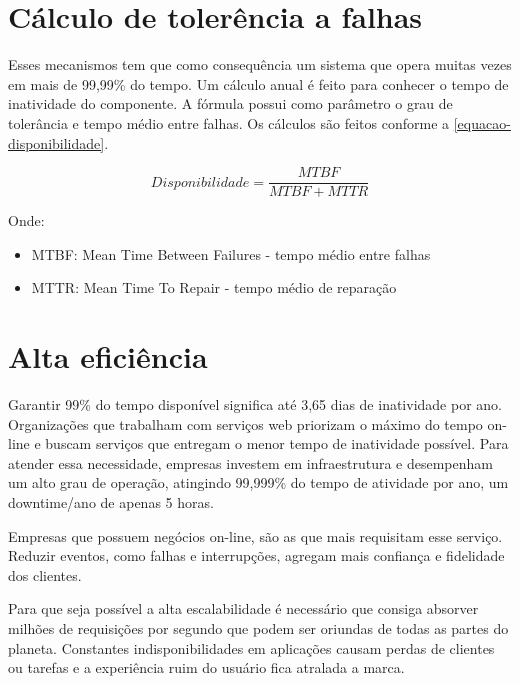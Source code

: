 \section{Cálculo de tolerência a falhas}

Esses mecanismos tem que como consequência um sistema que opera
muitas vezes em mais de 99,99\% do tempo.
Um cálculo anual é feito para conhecer o tempo de inatividade do componente.
A fórmula possui como parâmetro o grau de tolerância e tempo médio entre falhas.
Os cálculos são feitos conforme a \autoref{equacao-disponibilidade}.

\begin{equation}\label{equacao-disponibilidade}
Disponibilidade = \frac{MTBF}{MTBF + MTTR}
\end{equation}

Onde:

\begin{itemize}

	\item MTBF: Mean Time Between Failures - tempo médio entre falhas

	\item MTTR: Mean Time To Repair - tempo médio de reparação

\end{itemize}

\section{Alta eficiência}

Garantir 99\% do tempo disponível significa até 3,65 dias de inatividade por ano.
Organizações que trabalham com serviços web priorizam o máximo do tempo on-line e buscam
serviços que entregam o menor tempo de inatividade possível.
Para atender essa necessidade, empresas investem em infraestrutura e desempenham um alto
grau de operação, atingindo 99,999\% do tempo de atividade por ano, um downtime/ano de
apenas 5 horas.

Empresas que possuem negócios on-line, são as que mais requisitam esse serviço.
Reduzir eventos, como falhas e interrupções, agregam mais confiança e fidelidade dos clientes.

Para que seja possível a alta escalabilidade é necessário que consiga absorver milhões de
requisições por segundo que podem ser oriundas de todas as partes do planeta.
Constantes indisponibilidades em aplicações causam perdas de clientes ou tarefas e a experiência
ruim do usuário fica atralada a marca.

